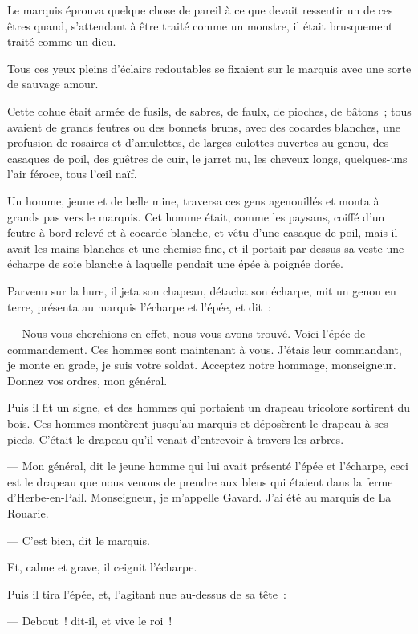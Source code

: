 \documentclass[french,twoside]{book} %
\begin{document}
Le marquis éprouva quelque chose de pareil à ce que devait ressentir un de ces êtres quand, s’attendant à être traité comme un monstre, il était brusquement traité comme un dieu.\par
Tous ces yeux pleins d’éclairs redoutables se fixaient sur le marquis avec une sorte de sauvage amour.\par
Cette cohue était armée de fusils, de sabres, de  faulx, de pioches, de bâtons ; tous avaient de grands feutres ou des bonnets bruns, avec des cocardes blanches, une profusion de rosaires et d’amulettes, de larges culottes ouvertes au genou, des casaques de poil, des guêtres de cuir, le jarret nu, les cheveux longs, quelques-uns l’air féroce, tous l’œil naïf.\par
Un homme, jeune et de belle mine, traversa ces gens agenouillés et monta à grands pas vers le marquis. Cet homme était, comme les paysans, coiffé d’un feutre à bord relevé et à cocarde blanche, et vêtu d’une casaque de poil, mais il avait les mains blanches et une chemise fine, et il portait par-dessus sa veste une écharpe de soie blanche à laquelle pendait une épée à poignée dorée.\par
Parvenu sur la hure, il jeta son chapeau, détacha son écharpe, mit un genou en terre, présenta au marquis l’écharpe et l’épée, et dit :\par
— Nous vous cherchions en effet, nous vous avons trouvé. Voici l’épée de commandement. Ces hommes sont maintenant à vous. J’étais leur commandant, je monte en grade, je suis votre soldat. Acceptez notre hommage, monseigneur. Donnez vos ordres, mon général.\par
Puis il fit un signe, et des hommes qui portaient un drapeau tricolore sortirent du bois. Ces hommes montèrent jusqu’au marquis et déposèrent le drapeau à ses pieds. C’était le drapeau qu’il venait d’entrevoir à travers les arbres.\par
— Mon général, dit le jeune homme qui lui avait présenté l’épée et l’écharpe, ceci est le drapeau que  nous venons de prendre aux bleus qui étaient dans la ferme d’Herbe-en-Pail. Monseigneur, je m’appelle Gavard. J’ai été au marquis de La Rouarie.\par
— C’est bien, dit le marquis.\par
Et, calme et grave, il ceignit l’écharpe.\par
Puis il tira l’épée, et, l’agitant nue au-dessus de sa tête :\par
— Debout ! dit-il, et vive le roi !\par
\end{document}
